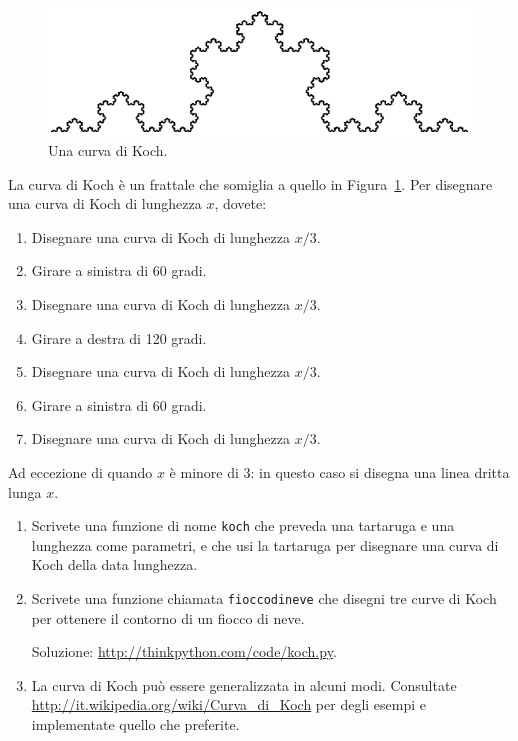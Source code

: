 \documentclass[10pt]{book}
\begin{document}
\vspace{0.2in}
\begin{figure}
\centerline
{\includegraphics[scale=0.8]{figs/koch.pdf}}
\caption{Una curva di Koch.}
\label{fig.koch}
\end{figure}

\begin{exercise}

La curva di Koch è un frattale che somiglia a quello in Figura~\ref{fig.koch}.  Per disegnare una curva di Koch di lunghezza $x$, dovete: 

\begin{enumerate}

\item Disegnare una curva di Koch di lunghezza $x/3$.

\item Girare a sinistra di 60 gradi.

\item Disegnare una curva di Koch di lunghezza $x/3$.

\item Girare a destra di 120 gradi.

\item Disegnare una curva di Koch di lunghezza $x/3$.

\item Girare a sinistra di 60 gradi.

\item Disegnare una curva di Koch di lunghezza $x/3$.

\end{enumerate}

Ad eccezione di quando $x$ è minore di 3: in questo caso si disegna una linea dritta lunga $x$.

\begin{enumerate}

\item Scrivete una funzione di nome {\tt koch} che preveda una tartaruga e una lunghezza come parametri, e che usi la tartaruga per disegnare una curva di Koch della data lunghezza.

\item Scrivete una funzione chiamata {\tt fioccodineve} che disegni tre curve di Koch per ottenere il contorno di un fiocco di neve.

Soluzione: \url{http://thinkpython.com/code/koch.py}.

\item La curva di Koch può essere generalizzata in alcuni modi. Consultate 
\url{http://it.wikipedia.org/wiki/Curva_di_Koch} per degli esempi e implementate quello che preferite.

\end{enumerate}
\end{exercise}
\end{document}
